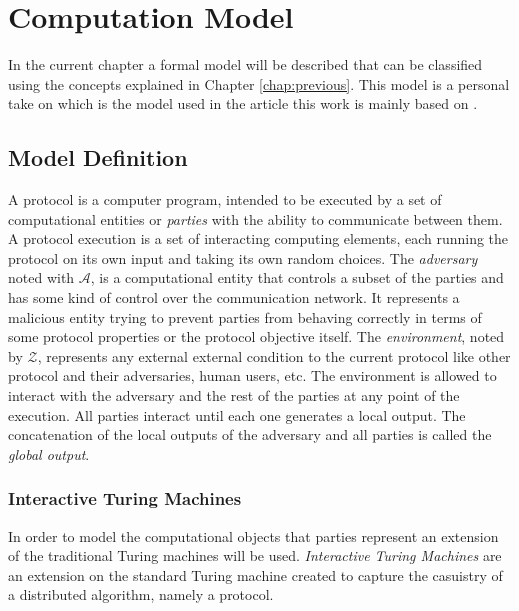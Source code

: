 \documentclass[..]{subfiles}
\begin{document}
\chapter{Computation Model}\label{chap:model}

In the current chapter a formal model will be described that can be classified using the concepts explained in Chapter \ref{chap:previous}. This model is a personal take on \cite{canetti2001universally} which is the model used in the article this work is mainly based on \cite{garay2015bitcoin}.


%


\section{Model Definition}

A protocol is a computer program, intended to be executed by a set of computational entities or \textit{parties} with the ability to communicate between them. A protocol execution is a set of interacting computing elements, each running the protocol on its own input and taking its own random choices. The \textit{adversary} noted with $\mathcal{A}$, is a computational entity that controls a subset of the parties and has some kind of control over the communication network. It represents a malicious entity trying to prevent parties from behaving correctly in terms of some protocol properties or the protocol objective itself. The \textit{environment}, noted by $\mathcal{Z}$, represents any external external condition to the current protocol like other protocol and their adversaries, human users, etc. The environment is allowed to interact with the adversary and the rest of the parties at any point of the execution. All parties interact until each one generates a local output. The concatenation of the local outputs of the adversary and all parties is called the \textit{global output}.


\subsection{Interactive Turing Machines}

In order to model the computational objects that parties represent an extension of the traditional Turing machines will be used. \textit{Interactive Turing Machines} are an extension on the standard Turing machine created to capture the casuistry of a distributed algorithm, namely a protocol. 
\end{document}
